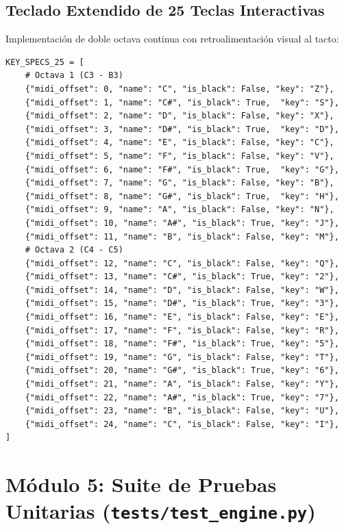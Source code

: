 \documentclass[11pt,a4paper]{article}
\begin{document}
\subsection{Teclado Extendido de 25 Teclas Interactivas}
Implementación de doble octava continua con retroalimentación visual al tacto:

\begin{lstlisting}
KEY_SPECS_25 = [
    # Octava 1 (C3 - B3)
    {"midi_offset": 0, "name": "C", "is_black": False, "key": "Z"},
    {"midi_offset": 1, "name": "C#", "is_black": True,  "key": "S"},
    {"midi_offset": 2, "name": "D", "is_black": False, "key": "X"},
    {"midi_offset": 3, "name": "D#", "is_black": True,  "key": "D"},
    {"midi_offset": 4, "name": "E", "is_black": False, "key": "C"},
    {"midi_offset": 5, "name": "F", "is_black": False, "key": "V"},
    {"midi_offset": 6, "name": "F#", "is_black": True,  "key": "G"},
    {"midi_offset": 7, "name": "G", "is_black": False, "key": "B"},
    {"midi_offset": 8, "name": "G#", "is_black": True,  "key": "H"},
    {"midi_offset": 9, "name": "A", "is_black": False, "key": "N"},
    {"midi_offset": 10, "name": "A#", "is_black": True, "key": "J"},
    {"midi_offset": 11, "name": "B", "is_black": False, "key": "M"},
    # Octava 2 (C4 - C5)
    {"midi_offset": 12, "name": "C", "is_black": False, "key": "Q"},
    {"midi_offset": 13, "name": "C#", "is_black": True, "key": "2"},
    {"midi_offset": 14, "name": "D", "is_black": False, "key": "W"},
    {"midi_offset": 15, "name": "D#", "is_black": True, "key": "3"},
    {"midi_offset": 16, "name": "E", "is_black": False, "key": "E"},
    {"midi_offset": 17, "name": "F", "is_black": False, "key": "R"},
    {"midi_offset": 18, "name": "F#", "is_black": True, "key": "5"},
    {"midi_offset": 19, "name": "G", "is_black": False, "key": "T"},
    {"midi_offset": 20, "name": "G#", "is_black": True, "key": "6"},
    {"midi_offset": 21, "name": "A", "is_black": False, "key": "Y"},
    {"midi_offset": 22, "name": "A#", "is_black": True, "key": "7"},
    {"midi_offset": 23, "name": "B", "is_black": False, "key": "U"},
    {"midi_offset": 24, "name": "C", "is_black": False, "key": "I"},
]
\end{lstlisting}

\section{Módulo 5: Suite de Pruebas Unitarias (\texttt{tests/test\_engine.py})}
\end{document}

